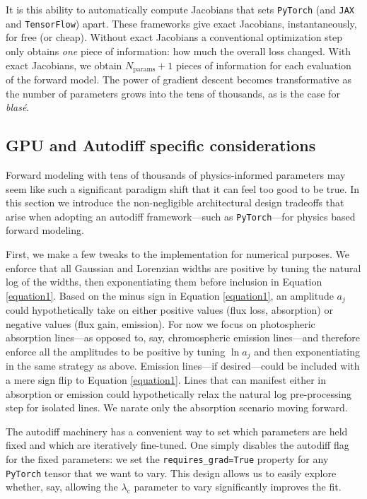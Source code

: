 \documentclass[trackchanges]{aastex631}
\begin{document}
It is this ability to automatically compute Jacobians that sets \texttt{PyTorch} (and \texttt{JAX} and \texttt{TensorFlow}) apart.  These frameworks give exact Jacobians, instantaneously, for free (or cheap).  Without exact Jacobians a conventional optimization step only obtains \emph{one} piece of information: how much the overall loss changed.  With exact Jacobians, we obtain $N_\mathrm{params}+1$ pieces of information for each evaluation of the forward model.  The power of gradient descent becomes transformative as the number of parameters grows into the tens of thousands, as is the case for \emph{blas\'e}.

\subsection{GPU and Autodiff specific considerations}\label{gpuConsiderations}

Forward modeling with tens of thousands of physics-informed parameters may seem like such a significant paradigm shift that it can feel too good to be true.  In this section we introduce the non-negligible architectural design tradeoffs that arise when adopting an autodiff framework---such as \texttt{PyTorch}---for physics based forward modeling.

First, we make a few tweaks to the implementation for numerical purposes. We enforce that all Gaussian and Lorenzian widths are positive by tuning the natural log of the widths, then exponentiating them before inclusion in Equation \ref{equation1}. Based on the minus sign in Equation \ref{equation1}, an amplitude $a_j$ could hypothetically take on either positive values (flux loss, absorption) or negative values (flux gain, emission).  For now we focus on photospheric absorption lines---as opposed to, say, chromospheric emission lines---and therefore enforce all the amplitudes to be positive by tuning $\ln{a_j}$ and then exponentiating in the same strategy as above.  Emission lines---if desired---could be included with a mere sign flip to Equation \ref{equation1}.  Lines that can manifest either in absorption or emission could hypothetically relax the natural log pre-processing step for isolated lines.  We narate only the absorption scenario moving forward.

The autodiff machinery has a convenient way to set which parameters are held fixed and which are iteratively fine-tuned.  One simply disables the autodiff flag for the fixed parameters: we set the \texttt{requires\_grad=True} property for any \texttt{PyTorch} tensor that we want to vary. This design allows us to easily explore whether, say, allowing the $\lambda_\mathrm{c}$ parameter to vary significantly improves the fit.
\end{document}

